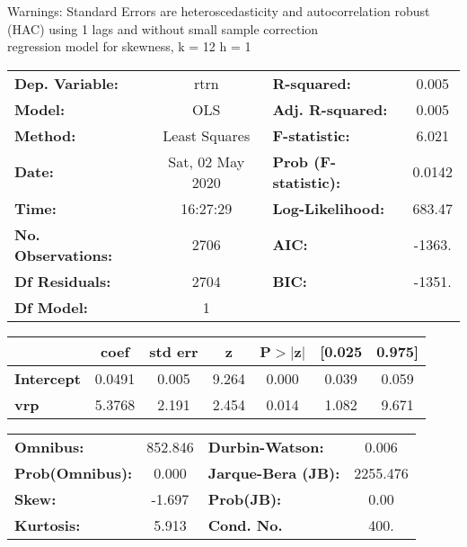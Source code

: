 Warnings: \newline
 [1] Standard Errors are heteroscedasticity and autocorrelation robust (HAC) using 1 lags and without small sample correction\\ 

regression model for skewness, k = 12 h = 1\begin{center}
\begin{tabular}{lclc}
\toprule
\textbf{Dep. Variable:}    &       rtrn       & \textbf{  R-squared:         } &     0.005   \\
\textbf{Model:}            &       OLS        & \textbf{  Adj. R-squared:    } &     0.005   \\
\textbf{Method:}           &  Least Squares   & \textbf{  F-statistic:       } &     6.021   \\
\textbf{Date:}             & Sat, 02 May 2020 & \textbf{  Prob (F-statistic):} &   0.0142    \\
\textbf{Time:}             &     16:27:29     & \textbf{  Log-Likelihood:    } &    683.47   \\
\textbf{No. Observations:} &        2706      & \textbf{  AIC:               } &    -1363.   \\
\textbf{Df Residuals:}     &        2704      & \textbf{  BIC:               } &    -1351.   \\
\textbf{Df Model:}         &           1      & \textbf{                     } &             \\
\bottomrule
\end{tabular}
\begin{tabular}{lcccccc}
                   & \textbf{coef} & \textbf{std err} & \textbf{z} & \textbf{P$> |$z$|$} & \textbf{[0.025} & \textbf{0.975]}  \\
\midrule
\textbf{Intercept} &       0.0491  &        0.005     &     9.264  &         0.000        &        0.039    &        0.059     \\
\textbf{vrp}       &       5.3768  &        2.191     &     2.454  &         0.014        &        1.082    &        9.671     \\
\bottomrule
\end{tabular}
\begin{tabular}{lclc}
\textbf{Omnibus:}       & 852.846 & \textbf{  Durbin-Watson:     } &    0.006  \\
\textbf{Prob(Omnibus):} &   0.000 & \textbf{  Jarque-Bera (JB):  } & 2255.476  \\
\textbf{Skew:}          &  -1.697 & \textbf{  Prob(JB):          } &     0.00  \\
\textbf{Kurtosis:}      &   5.913 & \textbf{  Cond. No.          } &     400.  \\
\bottomrule
\end{tabular}
\end{center}

